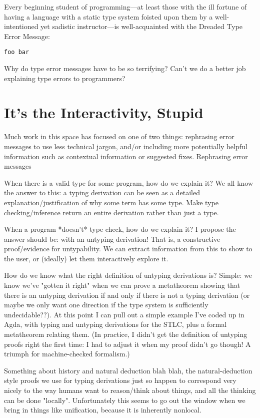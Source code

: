 \documentclass[sigplan, screen]{acmart}\settopmatter{printccs=false,printacmref=false}
\begin{document}
Every beginning student of programming---at least those with the ill
fortune of having a language with a static type system foisted upon
them by a well-intentioned yet sadistic instructor---is
well-acquainted with the Dreaded Type Error Message:

\begin{verbatim}
foo bar
\end{verbatim}

Why do type error messages have to be so terrifying?  Can't we do a
better job explaining type errors to programmers?

\section{It's the Interactivity, Stupid}

Much work in this space has focused on one of two things: rephrasing
error messages to use less technical jargon, and/or including more
potentially helpful information such as contextual information or
suggested fixes.  Rephrasing error messages 

When there is a valid type for some program, how do we explain it?  We all know the answer to this: a typing derivation can be seen as a detailed explanation/justification of why some term has some type.  Make type checking/inference return an entire derivation rather than just a type.

When a program *doesn't* type check, how do we explain it?  I propose the answer should be: with an untyping derivation!  That is, a constructive proof/evidence for untypability.  We can extract information from this to show to the user, or (ideally) let them interactively explore it.

How do we know what the right definition of untyping derivations is?  Simple: we know we've "gotten it right" when we can prove a metatheorem showing that there is an untyping derivation if and only if there is not a typing derivation (or maybe we only want one direction if the type system is sufficiently undecidable??).  At this point I can pull out a simple example I've coded up in Agda, with typing and untyping derivations for the STLC, plus a formal metatheorem relating them.  (In practice, I didn't get the definition of untyping proofs right the first time: I had to adjust it when my proof didn't go though!  A triumph for machine-checked formalism.)

Something about history and natural deduction blah blah, the natural-deduction style proofs we use for typing derivations just so happen to correspond very nicely to the way humans want to reason/think about things, and all the thinking can be done "locally".  Unfortunately this seems to go out the window when we bring in things like unification, because it is inherently nonlocal.
\end{document}
